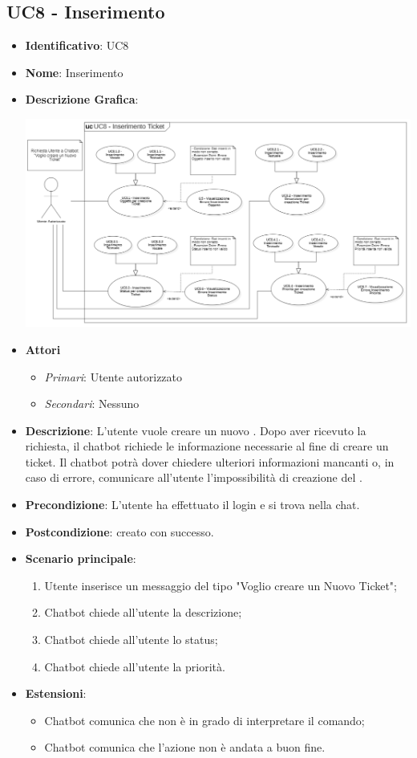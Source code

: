 \subsection{UC8 - Inserimento }
\begin{itemize}
	\item \textbf{Identificativo}: UC8
	\item \textbf{Nome}: Inserimento 
	\item\textbf{Descrizione Grafica}: 
	\begin{center}
		\includegraphics[scale=0.65]{images/UC8.png} 
	\end{center}

	\item \textbf{Attori}
	\begin{itemize} 
		\item \textit{Primari}: Utente autorizzato
		\item \textit{Secondari}: Nessuno 
	\end{itemize}
	\item \textbf{Descrizione}: L'utente vuole creare un nuovo . Dopo aver ricevuto la richiesta, il chatbot richiede le informazione necessarie al fine di creare un ticket. Il chatbot potrà dover chiedere ulteriori informazioni mancanti o, in caso di errore, comunicare all'utente l'impossibilità di creazione del .
	\item \textbf{Precondizione}: L'utente ha effettuato il login e si trova nella chat.
	\item \textbf{Postcondizione}:  creato con successo.
	\item \textbf{Scenario principale}: \begin{enumerate}
		\item Utente inserisce un messaggio del tipo "Voglio creare un Nuovo Ticket";
		\item Chatbot chiede all'utente la descrizione;
		\item Chatbot chiede all'utente lo status;
		\item Chatbot chiede all'utente la priorità.		 
	\end{enumerate}
	\item \textbf{Estensioni}: \begin{itemize}
		\item Chatbot comunica che non è in grado di interpretare il comando;
		\item Chatbot comunica che l'azione non è andata a buon fine.
	\end{itemize}
\end{itemize}
